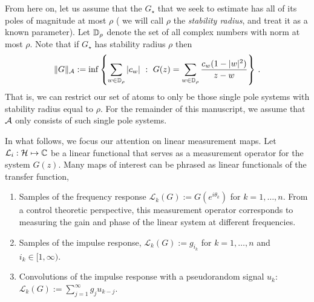 From here on, let us assume that the $G_\star$ that we seek to estimate has all
of its poles of magnitude at most $\rho$ ( we will call $\rho$ the
\emph{stability radius}, and treat it as a known parameter). Let $\mathbb{D}_\rho$
denote the set of all complex numbers with norm at most $\rho$. Note that if
$G_\star$ has stability radius $\rho$ then
\[
	\|G\|_{\mathcal{A}}:=\inf\left\{ \sum_{w\in \mathbb{D}_\rho} |c_w|~:~G(z) = \sum_{w\in \mathbb{D}_\rho} \frac{c_w (1-|w|^2)}{z-w}\right\}\,.
\]
That is, we can restrict our set of atoms to only be those single pole systems with stability radius equal to $\rho$.  For the remainder of this manuscript, we assume that $\mathcal{A}$ only consists of such single pole systems.

In what follows, we focus our attention on linear measurement maps.  Let $\mathcal{L}_i: \mathcal{H} \mapsto \mathbb{C} $ be a linear functional that serves as a measurement operator for the system $G(z)$.  Many maps of interest can be phrased as linear functionals of the transfer function,
\begin{enumerate}
	\item Samples of the frequency response $\mathcal{L}_k(G):=G(e^{i\theta_k})$ for $k=1,\ldots, n$.  From a control theoretic perspective, this measurement operator corresponds to measuring the gain and phase of the linear system at different frequencies.
	\item Samples of the impulse response, $\mathcal{L}_k(G):=g_{i_k}$ for $k=1,\ldots, n$ and $i_k \in [1,\infty)$.
	\item Convolutions of the impulse response with a pseudorandom signal $u_k$: $\mathcal{L}_k(G):=\sum_{j=1}^{\infty} g_j u_{k-j}$.
\end{enumerate}

